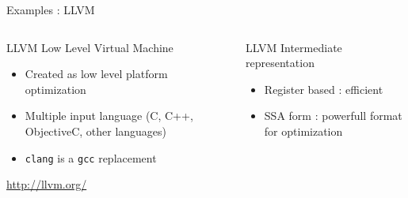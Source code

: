 %
\begin{Frame}{Examples : LLVM}
  \begin{columns}[t]
    \begin{column}{5cm} %
      \begin{block}{LLVM Low Level Virtual Machine}
        \begin{itemize}
        \item Created as low level platform optimization
        \item Multiple input language (C, C++, ObjectiveC, other languages)
        \item \texttt{clang} is a \texttt{gcc} replacement
        \end{itemize}
      \end{block} 
      \href{http://llvm.org/}{http://llvm.org/}
    \end{column}
    
    \begin{column}{5cm} %
      \begin{block}{LLVM Intermediate representation}
        \begin{itemize}
        \item Register based : efficient
        \item SSA form : powerfull format for optimization
        \end{itemize}
      \end{block}   
    \end{column}
  \end{columns}  
\end{Frame}


